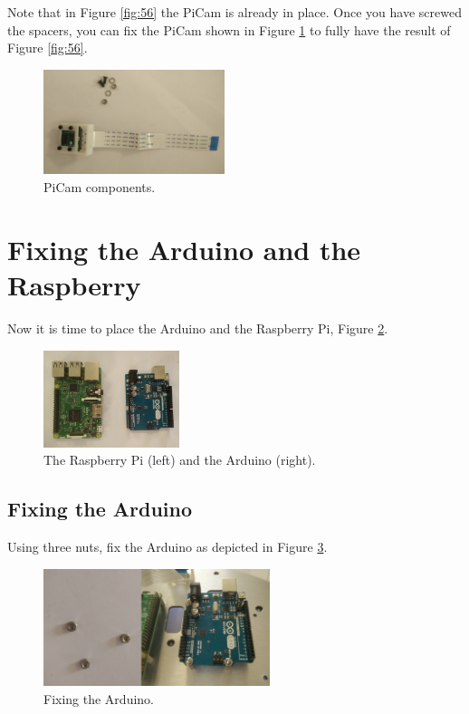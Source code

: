 \documentclass[10pt,a4paper]{report}   %
\begin{document}
 Note that in Figure \ref{fig:56} the PiCam is already in place. Once you have screwed the spacers, you can fix the PiCam shown in Figure \ref{fig:57} to fully have the result of Figure \ref{fig:56}.

\begin{figure}[H]
\center
\includegraphics[width=200px]{images/57.jpg}
\caption{PiCam components.}
\label{fig:57}
\end{figure}

\section{Fixing the Arduino and the Raspberry}

Now it is time to place the Arduino and the Raspberry Pi, Figure \ref{fig:58}.
\begin{figure}[H]
\center
\includegraphics[width=150px]{images/58.jpg}
\caption{The Raspberry Pi (left) and the Arduino (right).}
\label{fig:58}
\end{figure}

\subsection{Fixing the Arduino}

Using three nuts, fix the Arduino as depicted in Figure \ref{fig:60}.

\begin{figure}[H]
\center
\includegraphics[width=250px]{images/60.jpg}
\caption{Fixing the Arduino.}
\label{fig:60}
\end{figure}
\end{document}
